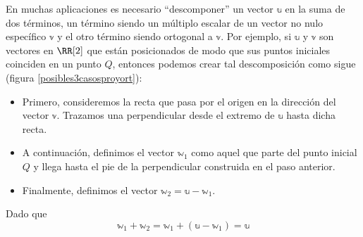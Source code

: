 En muchas aplicaciones es necesario “descomponer” un vector $\mathbb{u}$ en la suma de dos términos, un término siendo un múltiplo escalar de un vector no nulo específico $\mathbb{v}$ y el otro término siendo ortogonal a $\mathbb{v}$. Por ejemplo, si $\mathbb{u}$ y $\mathbb{v}$ son vectores en $\RR[2]$ que están posicionados de modo que sus puntos iniciales coinciden en un punto $Q$, entonces podemos crear tal descomposición como sigue (figura \ref{posibles3casosproyort}):
\begin{itemize}
    \item Primero, consideremos la recta que pasa por el origen en la dirección del vector $\mathbb{v}$. Trazamos una perpendicular desde el extremo de $\mathbb{u}$ hasta dicha recta.
    \item A continuación, definimos el vector $\mathbb{w}_1$ como aquel que parte del punto inicial $Q$ y llega hasta el pie de la perpendicular construida en el paso anterior.
    \item Finalmente, definimos el vector $\mathbb{w}_2 = \mathbb{u} - \mathbb{w}_1$.
\end{itemize}
Dado que
$$\mathbb{w}_1 + \mathbb{w}_2 = \mathbb{w}_1 + (\mathbb{u} - \mathbb{w}_1) = \mathbb{u}$$
